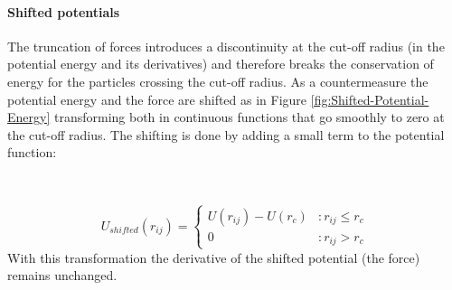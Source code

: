 \paragraph{Shifted potentials}

The truncation of forces introduces a discontinuity at the cut-off
radius (in the potential energy and its derivatives) and therefore
breaks the conservation of energy for the particles crossing the cut-off
radius. As a countermeasure the potential energy and the force are
shifted as in Figure \ref{fig:Shifted-Potential-Energy} transforming
both in continuous functions that go smoothly to zero at the cut-off
radius. The shifting is done by adding a small term to the potential
function:

\

\begin{equation}
U_{shifted}(r_{ij}) = \left\{   \begin{array}{lr}     U(r_{ij})-U(r_{c}) & : r_{ij}\leq r_{c} \label{eq:Shifted-Potential}\\     0 & : r_{ij}>r_{c}   \end{array} \right. \end{equation}
With
this transformation the derivative of the shifted potential (the force)
remains unchanged.
